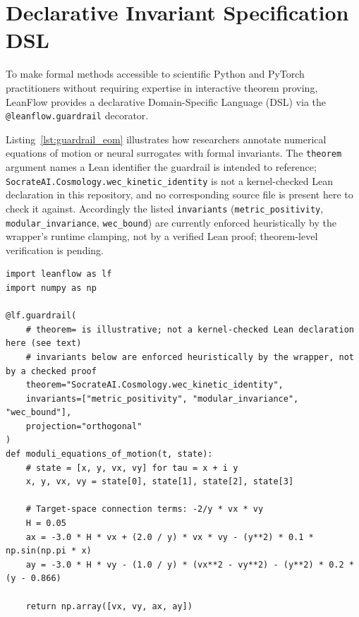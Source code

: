\documentclass[11pt,a4paper]{article}
\begin{document}
\section{Declarative Invariant Specification DSL}
\label{sec:dsl}

To make formal methods accessible to scientific Python and PyTorch practitioners without requiring expertise in interactive theorem proving, LeanFlow provides a declarative Domain-Specific Language (DSL) via the \texttt{@leanflow.guardrail} decorator.

Listing~\ref{lst:guardrail_eom} illustrates how researchers annotate numerical equations of motion or neural surrogates with formal invariants. The \texttt{theorem} argument names a Lean identifier the guardrail is intended to reference; \texttt{SocrateAI.Cosmology.wec\_kinetic\_identity} is not a kernel-checked Lean declaration in this repository, and no corresponding source file is present here to check it against. Accordingly the listed \texttt{invariants} (\texttt{metric\_positivity}, \texttt{modular\_invariance}, \texttt{wec\_bound}) are currently enforced heuristically by the wrapper's runtime clamping, not by a verified Lean proof; theorem-level verification is pending.

\begin{lstlisting}[language=python-leanflow, caption={\textbf{Declarative Invariant Specification via \texttt{@guardrail}.} The \texttt{theorem} argument is illustrative only; see text for kernel-checked status.}, label={lst:guardrail_eom}]
import leanflow as lf
import numpy as np

@lf.guardrail(
    # theorem= is illustrative; not a kernel-checked Lean declaration here (see text)
    # invariants below are enforced heuristically by the wrapper, not by a checked proof
    theorem="SocrateAI.Cosmology.wec_kinetic_identity",
    invariants=["metric_positivity", "modular_invariance", "wec_bound"],
    projection="orthogonal"
)
def moduli_equations_of_motion(t, state):
    # state = [x, y, vx, vy] for tau = x + i y
    x, y, vx, vy = state[0], state[1], state[2], state[3]

    # Target-space connection terms: -2/y * vx * vy
    H = 0.05
    ax = -3.0 * H * vx + (2.0 / y) * vx * vy - (y**2) * 0.1 * np.sin(np.pi * x)
    ay = -3.0 * H * vy - (1.0 / y) * (vx**2 - vy**2) - (y**2) * 0.2 * (y - 0.866)

    return np.array([vx, vy, ax, ay])
\end{lstlisting}
\end{document}
